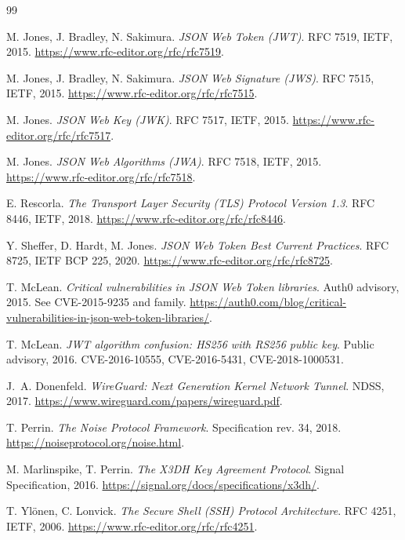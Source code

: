 \documentclass[11pt,a4paper]{article}
\theoremstyle{plain}
\theoremstyle{definition}
\begin{document}
\begin{thebibliography}{99}

 M. Jones, J. Bradley, N. Sakimura.
  \emph{JSON Web Token (JWT)}. RFC 7519, IETF, 2015.
  \url{https://www.rfc-editor.org/rfc/rfc7519}.

 M. Jones, J. Bradley, N. Sakimura.
  \emph{JSON Web Signature (JWS)}. RFC 7515, IETF, 2015.
  \url{https://www.rfc-editor.org/rfc/rfc7515}.

 M. Jones.
  \emph{JSON Web Key (JWK)}. RFC 7517, IETF, 2015.
  \url{https://www.rfc-editor.org/rfc/rfc7517}.

 M. Jones.
  \emph{JSON Web Algorithms (JWA)}. RFC 7518, IETF, 2015.
  \url{https://www.rfc-editor.org/rfc/rfc7518}.

 E. Rescorla.
  \emph{The Transport Layer Security (TLS) Protocol Version 1.3}.
  RFC 8446, IETF, 2018.
  \url{https://www.rfc-editor.org/rfc/rfc8446}.

 Y. Sheffer, D. Hardt, M. Jones.
  \emph{JSON Web Token Best Current Practices}. RFC 8725, IETF BCP 225,
  2020. \url{https://www.rfc-editor.org/rfc/rfc8725}.

 T. McLean.
  \emph{Critical vulnerabilities in JSON Web Token libraries}.
  Auth0 advisory, 2015.
  See CVE-2015-9235 and family.
  \url{https://auth0.com/blog/critical-vulnerabilities-in-json-web-token-libraries/}.

 T. McLean.
  \emph{JWT algorithm confusion: HS256 with RS256 public key}.
  Public advisory, 2016. CVE-2016-10555, CVE-2016-5431, CVE-2018-1000531.

 J.~A. Donenfeld.
  \emph{WireGuard: Next Generation Kernel Network Tunnel}.
  NDSS, 2017.
  \url{https://www.wireguard.com/papers/wireguard.pdf}.

 T. Perrin.
  \emph{The Noise Protocol Framework}. Specification rev. 34, 2018.
  \url{https://noiseprotocol.org/noise.html}.

 M. Marlinspike, T. Perrin.
  \emph{The X3DH Key Agreement Protocol}. Signal Specification, 2016.
  \url{https://signal.org/docs/specifications/x3dh/}.

 T. Yl\"onen, C. Lonvick.
  \emph{The Secure Shell (SSH) Protocol Architecture}. RFC 4251, IETF, 2006.
  \url{https://www.rfc-editor.org/rfc/rfc4251}.


\end{thebibliography}
\end{document}
